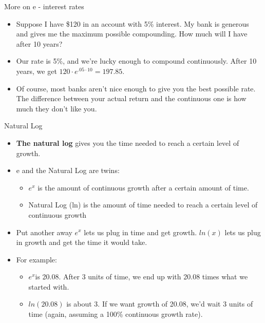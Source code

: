 \documentclass[
  ignorenonframetext,
]{beamer}
\begin{document}
\begin{frame}{More on e - interest rates}
\protect\hypertarget{more-on-e---interest-rates}{}

\begin{itemize}
\item
  Suppose I have \$120 in an account with 5\% interest. My bank is
  generous and gives me the maximum possible compounding. How much will
  I have after 10 years?
\item
  Our rate is 5\%, and we're lucky enough to compound continuously.
  After 10 years, we get \(120 · e^{.05 · 10} = 197.85\).
\item
  Of course, most banks aren't nice enough to give you the best possible
  rate. The difference between your actual return and the continuous one
  is how much they don't like you.
\end{itemize}

\end{frame}

\begin{frame}{Natural Log}
\protect\hypertarget{natural-log}{}

\begin{itemize}
\item
  \textbf{The natural log} gives you the time needed to reach a certain
  level of growth.
\item
  e and the Natural Log are twins:

  \begin{itemize}
  \item
    \(e^{x}\) is the amount of continuous growth after a certain amount
    of time.
  \item
    Natural Log (ln) is the amount of time needed to reach a certain
    level of continuous growth
  \end{itemize}
\item
  Put another away \(e^{x}\) lets us plug in time and get growth.
  \(ln(x)\) lets us plug in growth and get the time it would take.
\item
  For example:

  \begin{itemize}
  \item
    \(e^{x}\)is 20.08. After 3 units of time, we end up with 20.08 times
    what we started with.
  \item
    \(ln(20.08)\) is about 3. If we want growth of 20.08, we'd wait 3
    units of time (again, assuming a 100\% continuous growth rate).
  \end{itemize}
\end{itemize}

\end{frame}
\end{document}
